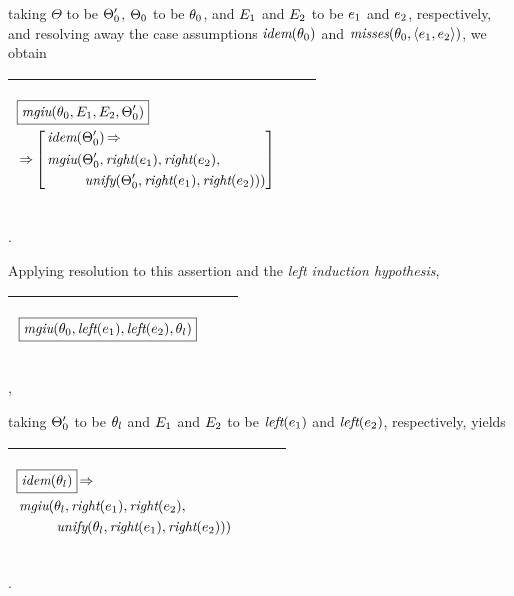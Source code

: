 \documentclass[runningheads]{llncs}
\DeclareMathOperator{\uimplies}{\Rightarrow}
\DeclareMathOperator{\unify}{\emph{unify}}
\DeclareMathOperator{\lef}{\emph{left}}
\DeclareMathOperator{\rig}{\emph{right}}
\DeclareMathOperator{\idem}{\emph{idem}}
\DeclareMathOperator{\mgiu}{\emph{mgiu}}
\begin{document}
taking $\Theta$ to be $\Theta_{0}'$, $\Theta_{0}$ to be $\theta_{0}$, and $E_{1}$ and $E_{2}$ to be $e_{1}$ and $e_{2}$, respectively, and resolving away the case assumptions $\idem(\thet{0})$ and $\emph{misses}(\theta_{0}, \langle e_{1}, e_{2} \rangle)$,  we obtain
  \begin{center}
  \begin{tabular}{|m{}|m{}||m{}|}
\hline
\begin{center}{$\begin{aligned}
&\boxed{\mgiu(\thet{0}, \E{1}, \E{2}, \Thet{0}')}   
 \\
 &\uimplies \left[\begin{aligned}&\idem(\Thet{0}') \uimplies \\
 &\begin{aligned}
    {\,\mgiu}(&\Thet{0}', \rig(\e{1}), \rig(\e{2}), \\
    &\unify(\Thet{0}', \rig(\e{1}), \rig(\e{2}))) 
\end{aligned}
\end{aligned}\right] \end{aligned}  $}  \hspace{1cm} 
\end{center}& &  \\  \hline
\end{tabular}.
\end{center}
Applying resolution to this assertion and the \emph{left induction hypothesis},
  \begin{center}
  \begin{tabular}{|m{}|m{}||m{}|}
\hline
\begin{center}
   ${\,\boxed{\mgiu(\thet{0}, \lef(\e{1}), \lef(\e{2}), \thet{l})}}$
   \end{center}  
& &  \\  \hline
\end{tabular},
\end{center}
taking $\Theta_{0}'$ to be $\theta_{l}$ and $E_{1}$ and $E_{2}$ to be $\lef(\e{1})$ and $\lef(\e{2})$, respectively, yields
  \begin{center}
  \begin{tabular}{|m{}|m{}||m{}|}
\hline
\begin{center}
{$\begin{aligned}
 &\begin{aligned}&\boxed{\idem(\thet{l})} \uimplies \\
 &\begin{aligned}
    {\,\mgiu}(&\thet{l}, \rig(\e{1}), \rig(\e{2}), \\
    &\unify(\thet{l}, \rig(\e{1}), \rig(\e{2}))) 
\end{aligned}
\end{aligned} \end{aligned}  $}  \hspace{1cm} 
\end{center}& &  \\  \hline
\end{tabular}.
\end{center}
\end{document}
